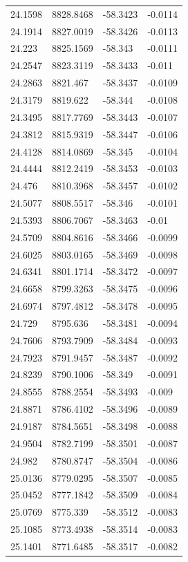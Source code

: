 \begin{table}[H]
\begin{tabular}{llll}
24.1598 & 8828.8468 & -58.3423 & -0.0114 \\
24.1914 & 8827.0019 & -58.3426 & -0.0113 \\
24.223 & 8825.1569 & -58.343 & -0.0111 \\
24.2547 & 8823.3119 & -58.3433 & -0.011 \\
24.2863 & 8821.467 & -58.3437 & -0.0109 \\
24.3179 & 8819.622 & -58.344 & -0.0108 \\
24.3495 & 8817.7769 & -58.3443 & -0.0107 \\
24.3812 & 8815.9319 & -58.3447 & -0.0106 \\
24.4128 & 8814.0869 & -58.345 & -0.0104 \\
24.4444 & 8812.2419 & -58.3453 & -0.0103 \\
24.476 & 8810.3968 & -58.3457 & -0.0102 \\
24.5077 & 8808.5517 & -58.346 & -0.0101 \\
24.5393 & 8806.7067 & -58.3463 & -0.01 \\
24.5709 & 8804.8616 & -58.3466 & -0.0099 \\
24.6025 & 8803.0165 & -58.3469 & -0.0098 \\
24.6341 & 8801.1714 & -58.3472 & -0.0097 \\
24.6658 & 8799.3263 & -58.3475 & -0.0096 \\
24.6974 & 8797.4812 & -58.3478 & -0.0095 \\
24.729 & 8795.636 & -58.3481 & -0.0094 \\
24.7606 & 8793.7909 & -58.3484 & -0.0093 \\
24.7923 & 8791.9457 & -58.3487 & -0.0092 \\
24.8239 & 8790.1006 & -58.349 & -0.0091 \\
24.8555 & 8788.2554 & -58.3493 & -0.009 \\
24.8871 & 8786.4102 & -58.3496 & -0.0089 \\
24.9187 & 8784.5651 & -58.3498 & -0.0088 \\
24.9504 & 8782.7199 & -58.3501 & -0.0087 \\
24.982 & 8780.8747 & -58.3504 & -0.0086 \\
25.0136 & 8779.0295 & -58.3507 & -0.0085 \\
25.0452 & 8777.1842 & -58.3509 & -0.0084 \\
25.0769 & 8775.339 & -58.3512 & -0.0083 \\
25.1085 & 8773.4938 & -58.3514 & -0.0083 \\
25.1401 & 8771.6485 & -58.3517 & -0.0082 \\

\end{tabular}
\end{table}
